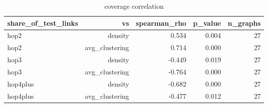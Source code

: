 \begin{table}[t]
\centering
\caption{coverage correlation}
\label{tab:coverage_correlation}
\begin{tabular}{lrrrr}
\hline
share\_of\_test\_links & vs & spearman\_rho & p\_value & n\_graphs \\
\hline
hop2 & density & 0.534 & 0.004 & 27 \\
hop2 & avg\_clustering & 0.714 & 0.000 & 27 \\
hop3 & density & -0.449 & 0.019 & 27 \\
hop3 & avg\_clustering & -0.764 & 0.000 & 27 \\
hop4plus & density & -0.682 & 0.000 & 27 \\
hop4plus & avg\_clustering & -0.477 & 0.012 & 27 \\
\hline
\end{tabular}
\end{table}
